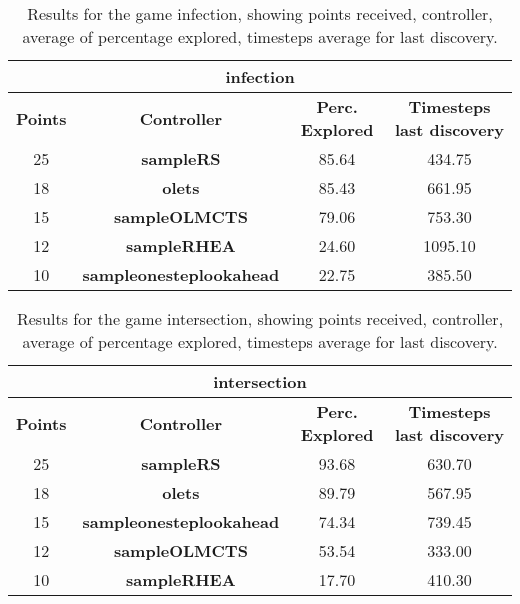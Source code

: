 \begin{table*}[!t]
\begin{center}
\begin{tabular}{|c|c|c|c|}
\multicolumn{4}{c}{\textbf{infection}}\\
\hline
\textbf{Points} & \textbf{Controller} & \textbf{Perc. Explored} &  \textbf{Timesteps last discovery}\\
\hline
25 & \textbf{sampleRS} & 85.64 & 434.75
 \\
\hline
18 & \textbf{olets} & 85.43 & 661.95
 \\
\hline
15 & \textbf{sampleOLMCTS} & 79.06 & 753.30
 \\
\hline
12 & \textbf{sampleRHEA} & 24.60 & 1095.10
 \\
\hline
10 & \textbf{sampleonesteplookahead} & 22.75 & 385.50
 \\
\hline
\end{tabular}
\caption{Results for the game infection, showing points received, controller, average of percentage explored, timesteps average for last discovery.}
\label{tab:weights}
\end{center}
\end{table*}
\begin{table*}[!t]
\begin{center}
\begin{tabular}{|c|c|c|c|}
\multicolumn{4}{c}{\textbf{intersection}}\\
\hline
\textbf{Points} & \textbf{Controller} & \textbf{Perc. Explored} &  \textbf{Timesteps last discovery}\\
\hline
25 & \textbf{sampleRS} & 93.68 & 630.70
 \\
\hline
18 & \textbf{olets} & 89.79 & 567.95
 \\
\hline
15 & \textbf{sampleonesteplookahead} & 74.34 & 739.45
 \\
\hline
12 & \textbf{sampleOLMCTS} & 53.54 & 333.00
 \\
\hline
10 & \textbf{sampleRHEA} & 17.70 & 410.30
 \\
\hline
\end{tabular}
\caption{Results for the game intersection, showing points received, controller, average of percentage explored, timesteps average for last discovery.}
\label{tab:weights}
\end{center}
\end{table*}
